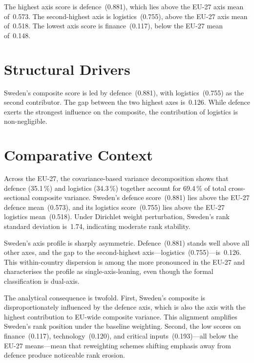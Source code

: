 \documentclass[12pt,a4paper]{article}
\begin{document}
The highest axis score is defence~(0.881), which lies above the EU-27 axis mean of~0.573.  The second-highest axis is logistics~(0.755), above the EU-27 axis mean of~0.518.  The lowest axis score is finance~(0.117), below the EU-27 mean of~0.148.


\section{Structural Drivers}
\label{sec:drivers}

\begin{sloppypar}
Sweden's composite score is led by defence~(0.881), with logistics~(0.755) as the second contributor.  The gap between the two highest axes is~0.126.  While defence exerts the strongest influence on the composite, the contribution of logistics is non-negligible.
\end{sloppypar}


\section{Comparative Context}
\label{sec:comparative}

Across the EU-27, the covariance-based variance decomposition shows that defence (35.1\,\%) and logistics (34.3\,\%) together account for 69.4\,\% of total cross-sectional composite variance.  Sweden's defence score~(0.881) lies above the EU-27 defence mean~(0.573), and its logistics score~(0.755) lies above the EU-27 logistics mean~(0.518).  Under Dirichlet weight perturbation, Sweden's rank standard deviation is~1.74, indicating moderate rank stability.



Sweden's axis profile is sharply asymmetric.  Defence~(0.881) stands well above all other axes, and the gap to the second-highest axis---logistics~(0.755)---is~0.126.  This within-country dispersion is among the more pronounced in the EU-27 and characterises the profile as single-axis-leaning, even though the formal classification is dual-axis.

The analytical consequence is twofold.  First, Sweden's composite is disproportionately influenced by the defence axis, which is also the axis with the highest contribution to EU-wide composite variance.  This alignment amplifies Sweden's rank position under the baseline weighting.  Second, the low scores on finance~(0.117), technology~(0.120), and critical inputs~(0.193)---all below the EU-27 means---mean that reweighting schemes shifting emphasis away from defence produce noticeable rank erosion.
\end{document}
